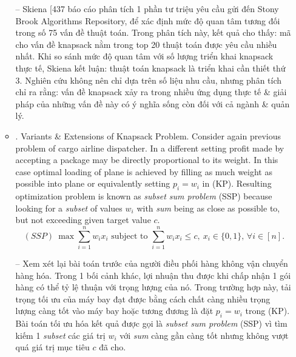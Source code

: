 \documentclass{article}
\begin{document}
\begin{itemize}
\begin{itemize}
        -- {\sc Skiena} [437 báo cáo phân tích 1 phần tư triệu yêu cầu gửi đến Stony Brook Algorithms Repository, để xác định mức độ quan tâm tương đối trong số 75 vấn đề thuật toán. Trong phân tích này, kết quả cho thấy: mã cho vấn đề knapsack nằm trong top 20 thuật toán được yêu cầu nhiều nhất. Khi so sánh mức độ quan tâm với số lượng triển khai knapsack thực tế, {\sc Skiena} kết luận: thuật toán knapsack là triển khai cần thiết thứ 3. Nghiên cứu không nên chỉ dựa trên số liệu nhu cầu, nhưng phân tích chỉ ra rằng: vấn đề knapsack xảy ra trong nhiều ứng dụng thực tế \& giải pháp của những vấn đề này có ý nghĩa sống còn đối với cả ngành \& quản lý.
        \item {. Variants \& Extensions of Knapsack Problem.} Consider again previous problem of cargo airline dispatcher. In a different setting profit made by accepting a package may be directly proportional to its weight. In this case optimal loading of plane is achieved by filling as much weight as possible into plane or equivalently setting $p_i = w_i$ in (KP). Resulting optimization problem is known as {\it subset sum problem} (SSP) because looking for a {\it subset} of values $w_i$ with {\it sum} being as close as possible to, but not exceeding given target value $c$.
        \begin{equation*}
            (SSP)\ \max\sum_{i=1}^n w_ix_i\mbox{ subject to }\sum_{i=1}^n w_ix_i\le c,\ x_i\in\{0,1\},\,\forall i\in[n].
        \end{equation*}

        -- Xem xét lại bài toán trước của người điều phối hàng không vận chuyển hàng hóa. Trong 1 bối cảnh khác, lợi nhuận thu được khi chấp nhận 1 gói hàng có thể tỷ lệ thuận với trọng lượng của nó. Trong trường hợp này, tải trọng tối ưu của máy bay đạt được bằng cách chất càng nhiều trọng lượng càng tốt vào máy bay hoặc tương đương là đặt $p_i = w_i$ trong (KP). Bài toán tối ưu hóa kết quả được gọi là {\it subset sum problem} (SSP) vì tìm kiếm 1 {\it subset} các giá trị $w_i$ với {\it sum} càng gần càng tốt nhưng không vượt quá giá trị mục tiêu $c$ đã cho.


\end{itemize}
\end{itemize}
\end{document}
